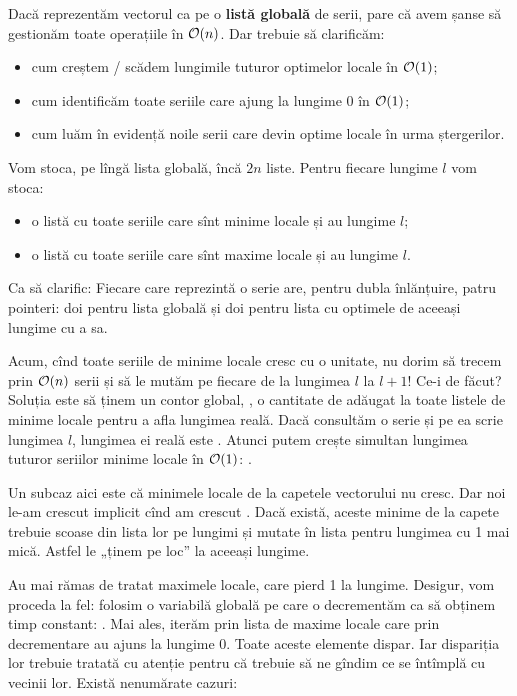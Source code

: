 \documentclass[../main.tex]{subfiles}
\begin{document}
Dacă reprezentăm vectorul ca pe o \textbf{listă globală} de serii, pare că avem șanse să gestionăm toate operațiile în $\mathcal{O}(n)$. Dar trebuie să clarificăm:

\begin{itemize}
  \item cum creștem / scădem lungimile tuturor optimelor locale în $\mathcal{O}(1)$;
  \item cum identificăm toate seriile care ajung la lungime 0 în $\mathcal{O}(1)$;
  \item cum luăm în evidență noile serii care devin optime locale în urma ștergerilor.
\end{itemize}

Vom stoca, pe lîngă lista globală, încă $2n$ liste. Pentru fiecare lungime $l$ vom stoca:

\begin{itemize}
  \item o listă cu toate seriile care sînt minime locale și au lungime $l$;
  \item o listă cu toate seriile care sînt maxime locale și au lungime $l$.
\end{itemize}

Ca să clarific: Fiecare  care reprezintă o serie are, pentru dubla înlănțuire, patru pointeri: doi pentru lista globală și doi pentru lista cu optimele de aceeași lungime cu a sa.

Acum, cînd toate seriile de minime locale cresc cu o unitate, nu dorim să trecem prin $\mathcal{O}(n)$ serii și să le mutăm pe fiecare de la lungimea $l$ la $l+1$! Ce-i de făcut? Soluția este să ținem un contor global, , o cantitate de adăugat la toate listele de minime locale pentru a afla lungimea reală. Dacă consultăm o serie și pe ea scrie lungimea $l$, lungimea ei reală este . Atunci putem crește simultan lungimea tuturor seriilor minime locale în $\mathcal{O}(1)$: .

Un subcaz aici este că minimele locale de la capetele vectorului nu cresc. Dar noi le-am crescut implicit cînd am crescut . Dacă există, aceste minime de la capete trebuie scoase din lista lor pe lungimi și mutate în lista pentru lungimea cu 1 mai mică. Astfel le „ținem pe loc” la aceeași lungime.

Au mai rămas de tratat maximele locale, care pierd 1 la lungime. Desigur, vom proceda la fel: folosim o variabilă globală pe care o decrementăm ca să obținem timp constant: . Mai ales, iterăm prin lista de maxime locale care prin decrementare au ajuns la lungime 0. Toate aceste elemente dispar. Iar dispariția lor trebuie tratată cu atenție pentru că trebuie să ne gîndim ce se întîmplă cu vecinii lor. Există nenumărate cazuri:
\end{document}
